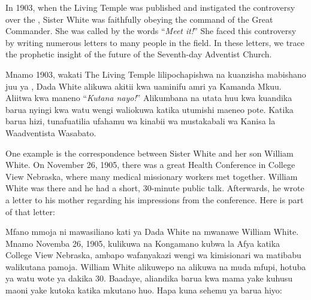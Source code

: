  \label{chap:apostasy}


 \label{chap:apostasy}


In 1903, when the Living Temple was published and instigated the controversy over the , Sister White was faithfully obeying the command of the Great Commander. She was called by the words “\textit{Meet it!}” She faced this controversy by writing numerous letters to many people in the field. In these letters, we trace the prophetic insight of the future of the Seventh-day Adventist Church.


Mnamo 1903, wakati The Living Temple lilipochapishwa na kuanzisha mabishano juu ya , Dada White alikuwa akitii kwa uaminifu amri ya Kamanda Mkuu. Aliitwa kwa maneno “\textit{Kutana nayo!}” Alikumbana na utata huu kwa kuandika barua nyingi kwa watu wengi waliokuwa katika utumishi maeneo pote. Katika barua hizi, tunafuatilia ufahamu wa kinabii wa mustakabali wa Kanisa la Waadventista Wasabato.


One example is the correspondence between Sister White and her son William White. On November 26, 1905, there was a great Health Conference in College View Nebraska, where many medical missionary workers met together. William White was there and he had a short, 30-minute public talk. Afterwards, he wrote a letter to his mother regarding his impressions from the conference. Here is part of that letter:


Mfano mmoja ni mawasiliano kati ya Dada White na mwanawe William White. Mnamo Novemba 26, 1905, kulikuwa na Kongamano kubwa la Afya katika College View Nebraska, ambapo wafanyakazi wengi wa kimisionari wa matibabu walikutana pamoja. William White alikuwepo na alikuwa na muda mfupi, hotuba ya watu wote ya dakika 30. Baadaye, aliandika barua kwa mama yake kuhusu maoni yake kutoka katika mkutano huo. Hapa kuna sehemu ya barua hiyo:


 \\
 \\


 \\
 \\


